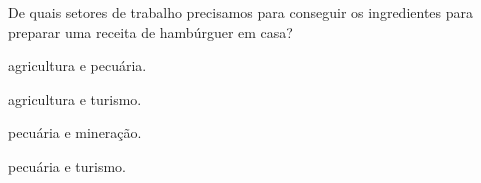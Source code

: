 \noindent{}De quais setores de trabalho precisamos para conseguir os ingredientes
para preparar uma receita de hambúrguer em casa?

\begin{minipage}{0.5\textwidth}
\begin{escolha}
\item agricultura e pecuária.

\item agricultura e turismo.

\item pecuária e mineração.

\item pecuária e turismo.
\end{escolha}
\end{minipage}
